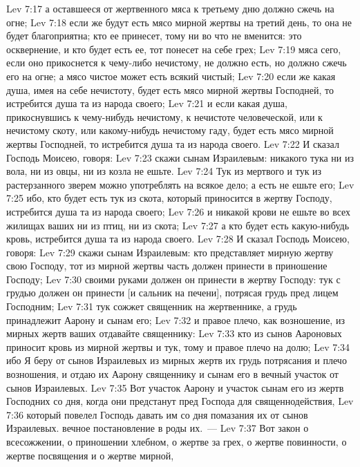 \vs Lev 7:17 а оставшееся от жертвенного мяса к третьему дню должно сжечь на огне;
\vs Lev 7:18 если же будут есть мясо мирной жертвы на третий день, то она не будет благоприятна; кто ее принесет, тому ни во что не вменится: это осквернение, и кто будет есть ее, тот понесет на себе грех;
\vs Lev 7:19 мяса сего, если оно прикоснется к чему-либо нечистому, не должно есть, но должно сжечь его на огне; а мясо чистое может есть всякий чистый;
\vs Lev 7:20 если же какая душа, имея на себе нечистоту, будет есть мясо мирной жертвы Господней, то истребится душа та из народа своего;
\vs Lev 7:21 и если какая душа, прикоснувшись к чему-нибудь нечистому, к нечистоте человеческой, или к нечистому скоту, или какому-нибудь нечистому гаду, будет есть мясо мирной жертвы Господней, то истребится душа та из народа своего.
\rsbpar\vs Lev 7:22 И сказал Господь Моисею, говоря:
\vs Lev 7:23 скажи сынам Израилевым: никакого тука ни из вола, ни из овцы, ни из козла не ешьте.
\vs Lev 7:24 Тук из мертвого и тук из растерзанного зверем можно употреблять на всякое дело; а есть не ешьте его;
\vs Lev 7:25 ибо, кто будет есть тук из скота, который приносится в жертву Господу, истребится душа та из народа своего;
\vs Lev 7:26 и никакой крови не ешьте во всех жилищах ваших ни из птиц, ни из скота;
\vs Lev 7:27 а кто будет есть какую-нибудь кровь, истребится душа та из народа своего.
\rsbpar\vs Lev 7:28 И сказал Господь Моисею, говоря:
\vs Lev 7:29 скажи сынам Израилевым: кто представляет мирную жертву свою Господу, тот из мирной жертвы часть должен принести в приношение Господу;
\vs Lev 7:30 своими руками должен он принести в жертву Господу: тук с грудью должен он принести [и сальник на печени], потрясая грудь пред лицем Господним;
\vs Lev 7:31 тук сожжет священник на жертвеннике, а грудь принадлежит Аарону и сынам его;
\vs Lev 7:32 и правое плечо, как возношение, из мирных жертв ваших отдавайте священнику:
\vs Lev 7:33 кто из сынов Аароновых приносит кровь из мирной жертвы и тук, тому и правое плечо на долю;
\vs Lev 7:34 ибо Я беру от сынов Израилевых из мирных жертв их грудь потрясания и плечо возношения, и отдаю их Аарону священнику и сынам его в вечный участок от сынов Израилевых.
\vs Lev 7:35 Вот участок Аарону и участок сынам его из жертв Господних со дня, когда они предстанут пред Господа для священнодействия,
\vs Lev 7:36 который повелел Господь давать им со дня помазания их от сынов Израилевых.  вечное постановление в роды их.~---
\vs Lev 7:37 Вот закон о всесожжении, о приношении хлебном, о жертве за грех, о жертве повинности, о жертве посвящения и о жертве мирной,
